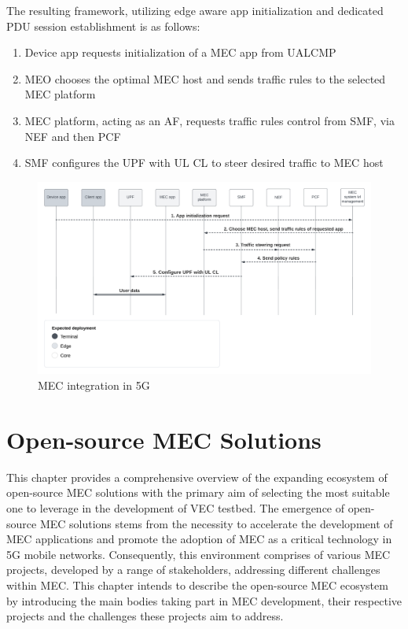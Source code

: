 \documentclass[12pt,a4paper,twoside]{report}
\begin{document}
The resulting framework, utilizing edge aware app initialization and dedicated PDU session establishment is as follows: 
\begin{enumerate}
	\item Device app requests initialization of a MEC app from UALCMP
	\item MEO chooses the optimal MEC host and sends traffic rules to the selected MEC platform
	\item MEC platform, acting as an AF, requests traffic rules control from SMF, via NEF and then PCF 
	\item SMF configures the UPF with UL CL to steer desired traffic to MEC host
\end{enumerate}

\begin{figure}[ht]
	\centering
	\includegraphics[width=\textwidth]{./images/MEC-5G-integration-flowchart.png}
	\caption{MEC integration in 5G}
	\label{F:MEC-5G-integration}
\end{figure}

\chapter{Open-source MEC Solutions}
\label{ch:o-sMEC}
This chapter provides a comprehensive overview of the expanding ecosystem of open-source MEC solutions with the primary aim of selecting the most suitable one to leverage in the development of VEC testbed. The emergence of open-source MEC solutions stems from the necessity to accelerate the development of MEC applications and promote the adoption of MEC as a critical technology in 5G mobile networks. Consequently, this environment comprises of various MEC projects, developed by a range of stakeholders, addressing different challenges within MEC. This chapter intends to describe the open-source MEC ecosystem by introducing the main bodies taking part in MEC development, their respective projects and the challenges these projects aim to address. 
\end{document}
